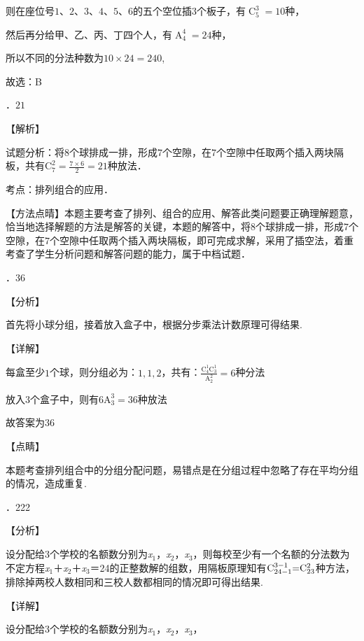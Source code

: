 \noindent 则在座位号$1$、$2$、$3$、$4$、$5$、$6$的五个空位插3个板子，有$\mathop{C}\nolimits_{5}^{3} =10$种，

\noindent 然后再分给甲、乙、丙、丁四个人，有$\mathop{A}\nolimits_{4}^{4} =24$种，

\noindent 所以不同的分法种数为$10\times 24=240$,

\noindent 故选：B

．$21$

\noindent 【解析】

\noindent 试题分析：将$8$个球排成一排，形成$7$个空隙，在$7$个空隙中任取两个插入两块隔板，共有$\mathrm C_{7}^{2} =\frac{7\times 6}{2} =21$种放法．

\noindent 考点：排列组合的应用．

\noindent 【方法点晴】本题主要考查了排列、组合的应用、解答此类问题要正确理解题意，恰当地选择解题的方法是解答的关键，本题的解答中，将$8$个球排成一排，形成$7$个空隙，在$7$个空隙中任取两个插入两块隔板，即可完成求解，采用了插空法，着重考查了学生分析问题和解答问题的能力，属于中档试题．

．36

\noindent 【分析】

\noindent 首先将小球分组，接着放入盒子中，根据分步乘法计数原理可得结果.

\noindent 【详解】

\noindent 每盒至少$1$个球，则分组必为：$1,1,2$，共有：$\frac{\mathrm C_{4}^{1} \mathrm C_{3}^{1} }{\mathrm A_{2}^{2} } =6$种分法

\noindent 放入$3$个盒子中，则有$6\mathrm A_{3}^{3} =36$种放法

\noindent 故答案为$36$

\noindent 【点睛】

\noindent 本题考查排列组合中的分组分配问题，易错点是在分组过程中忽略了存在平均分组的情况，造成重复.

．222

\noindent 【分析】

\noindent 设分配给3个学校的名额数分别为\textit{x}${}_{1}$，\textit{x}${}_{2}$，\textit{x}${}_{3}$，则每校至少有一个名额的分法数为不定方程\textit{x}${}_{1}$＋\textit{x}${}_{2}$＋\textit{x}${}_{3}$＝24的正整数解的组数，用隔板原理知有$\mathrm C_{24-1}^{3{\rm -}1} {\rm =}\mathrm C_{23}^{2} $种方法，排除掉两校人数相同和三校人数都相同的情况即可得出结果.

\noindent 【详解】

\noindent 设分配给3个学校的名额数分别为\textit{x}${}_{1}$，\textit{x}${}_{2}$，\textit{x}${}_{3}$，

